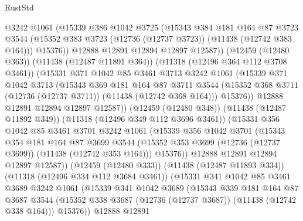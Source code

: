 \begin{lexlean}{RustStd}
\begin{coremodule}
                @3242
                @1061
                (@15339
                  @386
                  @1042
                  @3725
                  (@15343
                    @384
                    @181
                    @164
                    @87
                    @3723
                    @3544
                    (@15352 @383 @3723 (@12736 (@12737 @3723)) (@11438 (@12742 @383 @164)))
                    @15376))
                @12888
                @12891
                @12894
                @12897
                @12587))
            (@12459 (@12480 @363))
            (@11438 (@12487 @11891 @364))
            (@11318 (@12496 @364 @112 @3708 @3461))
            (@15331
              @371
              @1042
              @85
              @3461
              @3713
              @3242
              @1061
              (@15339
                @371
                @1042
                @3713
                (@15343
                  @369
                  @181
                  @164
                  @87
                  @3711
                  @3544
                  (@15352 @368 @3711 (@12736 (@12737 @3711)) (@11438 (@12742 @368 @164)))
                  @15376))
              @12888
              @12891
              @12894
              @12897
              @12587))
          (@12459 (@12480 @348))
          (@11438 (@12487 @11892 @349))
          (@11318 (@12496 @349 @112 @3696 @3461))
          (@15331
            @356
            @1042
            @85
            @3461
            @3701
            @3242
            @1061
            (@15339
              @356
              @1042
              @3701
              (@15343
                @354
                @181
                @164
                @87
                @3699
                @3544
                (@15352 @353 @3699 (@12736 (@12737 @3699)) (@11438 (@12742 @353 @164)))
                @15376))
            @12888
            @12891
            @12894
            @12897
            @12587))
        (@12459 (@12480 @333))
        (@11438 (@12487 @11893 @334))
        (@11318 (@12496 @334 @112 @3684 @3461))
        (@15331
          @341
          @1042
          @85
          @3461
          @3689
          @3242
          @1061
          (@15339
            @341
            @1042
            @3689
            (@15343
              @339
              @181
              @164
              @87
              @3687
              @3544
              (@15352 @338 @3687 (@12736 (@12737 @3687)) (@11438 (@12742 @338 @164)))
              @15376))
          @12888
          @12891

\end{coremodule}
\end{lexlean}
